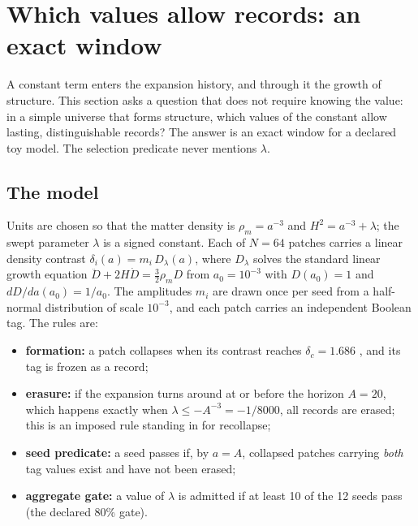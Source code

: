 \hypertarget{which-values-allow-records-an-exact-window}{%
\section{Which values allow records: an exact
window}\label{which-values-allow-records-an-exact-window}}

A constant term enters the expansion history, and through it the growth
of structure. This section asks a question that does not require knowing
the value: in a simple universe that forms structure, which values of
the constant allow lasting, distinguishable records? The answer is an
exact window for a declared toy model. The selection predicate never
mentions \(\lambda\).

\hypertarget{the-model}{%
\subsection{The model}\label{the-model}}

Units are chosen so that the matter density is \(\rho_m=a^{-3}\) and
\(H^2=a^{-3}+\lambda\); the swept parameter \(\lambda\) is a signed
constant. Each of \(N=64\) patches carries a linear density contrast
\(\delta_i(a)=m_i\,D_\lambda(a)\), where \(D_\lambda\) solves the
standard linear growth equation \(\ddot D+2H\dot D=\tfrac32\rho_m D\)
from \(a_0=10^{-3}\) with \(D(a_0)=1\) and \(dD/da(a_0)=1/a_0\). The
amplitudes \(m_i\) are drawn once per seed from a half-normal
distribution of scale \(10^{-3}\), and each patch carries an independent
Boolean tag. The rules are:

\begin{itemize}
\tightlist
\item
  \textbf{formation:} a patch collapses when its contrast reaches
  \(\delta_c=1.686\) \citep{GunnGott1972}, and its tag is frozen as a
  record;
\item
  \textbf{erasure:} if the expansion turns around at or before the
  horizon \(A=20\), which happens exactly when
  \(\lambda\le-A^{-3}=-1/8000\), all records are erased; this is an
  imposed rule standing in for recollapse;
\item
  \textbf{seed predicate:} a seed passes if, by \(a=A\), collapsed
  patches carrying \emph{both} tag values exist and have not been
  erased;
\item
  \textbf{aggregate gate:} a value of \(\lambda\) is admitted if at
  least 10 of the 12 seeds pass (the declared 80\% gate).
\end{itemize}

